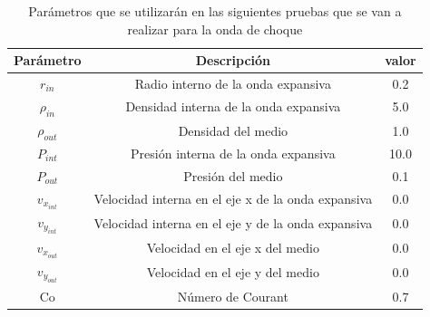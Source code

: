 \documentclass[12pt,a4paper]{book}
\begin{document}
\begin{table}[htbp]\label{Tabla_parametros}
\begin{center}
\begin{tabular}{|c|c|c|}
\hline 
\textbf{Parámetro} & \textbf{Descripción} & \textbf{valor} \\ 
\hline 
$r_{in}$ & Radio interno de la onda expansiva & 0.2 \\ 
\hline 
$\rho_{in}$ &  Densidad interna de la onda expansiva & 5.0 \\ 
\hline 
$\rho_{out}$ &  Densidad del medio  & 1.0 \\
\hline 
$P_{int}$ & Presión interna de la onda expansiva & 10.0 \\ 
\hline 
$P_{out}$ &  Presión del medio  & 0.1 \\ 
\hline 
$v_{x_{int}}$ & Velocidad interna en el eje x de la onda expansiva & 0.0 \\ 
\hline 
$v_{y_{int}}$ & Velocidad interna en el eje y de la onda expansiva & 0.0 \\ 
\hline 
$v_{x_{out}}$ & Velocidad en el eje x del medio & 0.0 \\
\hline 
$v_{y_{out}}$ & Velocidad en el eje y del medio & 0.0 \\ 
\hline 
Co & Número de Courant & 0.7 \\ 
\hline 
\end{tabular}
\caption{Parámetros que se utilizarán en las siguientes pruebas que se van a realizar para la onda de choque}
\end{center}
\end{table}
\end{document}
